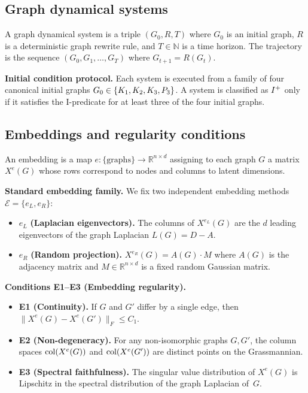 \documentclass{../shared/primo}
\begin{document}
\subsection{Graph dynamical systems}

\begin{definition}\label{def:gds}
A graph dynamical system is a triple $(G_0, R, T)$ where $G_0$ is an initial graph, $R$ is a deterministic graph rewrite rule, and $T \in \mathbb{N}$ is a time horizon. The trajectory is the sequence $(G_0, G_1, \ldots, G_T)$ where $G_{t+1} = R(G_t)$.
\end{definition}

\textbf{Initial condition protocol.} Each system is executed from a family of four canonical initial graphs $G_0 \in \{K_{1}, K_{2}, K_{3}, P_{3}\}$. A system is classified as $I\textsuperscript{+}$ only if it satisfies the I-predicate for at least three of the four initial graphs.

\subsection{Embeddings and regularity conditions}

\begin{definition}[Embedding]\label{def:embedding}
An embedding is a map $e: \{\text{graphs}\} \to \mathbb{R}^{n \times d}$ assigning to each graph $G$ a matrix $X^e(G)$ whose rows correspond to nodes and columns to latent dimensions.
\end{definition}

\textbf{Standard embedding family.} We fix two independent embedding methods $\mathcal{E} = \{e_L, e_R\}$:
\begin{itemize}
\item $e_L$ \textbf{(Laplacian eigenvectors).} The columns of $X^{e_L}(G)$ are the $d$ leading eigenvectors of the graph Laplacian $L(G) = D - A$.
\item $e_R$ \textbf{(Random projection).} $X^{e_R}(G) = A(G) \cdot M$ where $A(G)$ is the adjacency matrix and $M \in \mathbb{R}^{n \times d}$ is a fixed random Gaussian matrix.
\end{itemize}

\textbf{Conditions E1--E3 (Embedding regularity).}
\begin{itemize}
\item \textbf{E1 (Continuity).} If $G$ and $G'$ differ by a single edge, then $\|X^e(G) - X^e(G')\|_F \leq C_1$.
\item \textbf{E2 (Non-degeneracy).} For any non-isomorphic graphs $G, G'$, the column spaces $\operatorname{col}(X^e(G))$ and $\operatorname{col}(X^e(G'))$ are distinct points on the Grassmannian.
\item \textbf{E3 (Spectral faithfulness).} The singular value distribution of $X^e(G)$ is Lipschitz in the spectral distribution of the graph Laplacian of~$G$.
\end{itemize}
\end{document}
